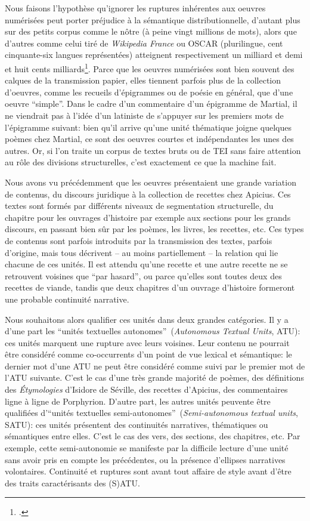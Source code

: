 Nous faisons l'hypothèse qu'ignorer les ruptures inhérentes aux oeuvres numérisées peut porter préjudice à la sémantique distributionnelle, d'autant plus sur des petits corpus comme le nôtre (à peine vingt millions de mots), alors que d'autres comme celui tiré de \textit{Wikipedia France} ou OSCAR (plurilingue, cent cinquante-six langues représentées) atteignent respectivement un milliard et demi et huit cents milliards\footcite{noauthor_statistiques_nodate, ortizsuarez_hal-02148693}. Parce que les oeuvres numérisées sont bien souvent des calques de la transmission papier, elles tiennent parfois plus de la collection d'oeuvres, comme les recueils d'épigrammes ou de poésie en général, que d'une oeuvre \enquote{simple}. Dans le cadre d'un commentaire d'un épigramme de Martial, il ne viendrait pas à l'idée d'un latiniste de s'appuyer sur les premiers mots de l'épigramme suivant: bien qu'il arrive qu'une unité thématique joigne quelques poèmes chez Martial, ce sont des oeuvres courtes et indépendantes les unes des autres. Or, si l'on traite un corpus de textes bruts ou de TEI sans faire attention au rôle des divisions structurelles, c'est exactement ce que la machine fait.

Nous avons vu précédemment que les oeuvres présentaient une grande variation de contenus, du discours juridique à la collection de recettes chez Apicius. Ces textes sont formés par différents niveaux de segmentation structurelle, du chapitre pour les ouvrages d'histoire par exemple aux sections pour les grands discours, en passant bien sûr par les poèmes, les livres, les recettes, etc. Ces types de contenus sont parfois introduits par la transmission des textes, parfois d'origine, mais tous décrivent -- au moins partiellement -- la relation qui lie chacune de ces unités. Il est attendu qu'une recette et une autre recette ne se retrouvent voisines que \enquote{par hasard}, ou parce qu'elles sont toutes deux des recettes de viande, tandis que deux chapitres d'un ouvrage d'histoire formeront une probable continuité narrative.

Nous souhaitons alors qualifier ces unités dans deux grandes catégories. Il y a d'une part les \enquote{unités textuelles autonomes}~(\textit{Autonomous Textual Units}, ATU): ces unités marquent une rupture avec leurs voisines. Leur contenu ne pourrait être considéré comme co-occurrents d'un point de vue lexical et sémantique: le dernier mot d'une ATU ne peut être considéré comme suivi par le premier mot de l'ATU suivante. C'est le cas d'une très grande majorité de poèmes, des définitions des \textit{Étymologies} d'Isidore de Séville, des recettes d'Apicius, des commentaires ligne à ligne de Porphyrion. D'autre part, les autres unités peuvente être qualifiées d'\enquote{unités textuelles semi-autonomes}~(\textit{Semi-autonomous textual units}, SATU): ces unités présentent des continuités narratives, thématiques ou sémantiques entre elles. C'est le cas des vers, des sections, des chapitres, etc. Par exemple, cette semi-autonomie se manifeste par la difficile lecture d'une unité sans avoir pris en compte les précédentes, ou la présence d'ellipses narratives volontaires. Continuité et ruptures sont avant tout affaire de style avant d'être des traits caractérisants des (S)ATU.

